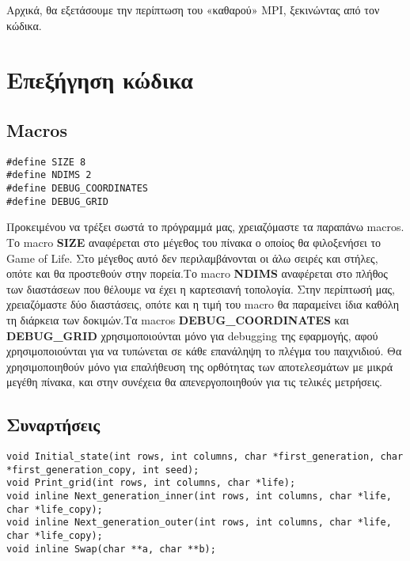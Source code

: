 Αρχικά, θα εξετάσουμε την περίπτωση του «καθαρού» MPI, ξεκινώντας από τον κώδικα.
\section{Επεξήγηση κώδικα}

\subsection{Macros} \label{sec:macros}

\begin{tcolorbox}
\begin{verbatim}
#define SIZE 8
#define NDIMS 2
#define DEBUG_COORDINATES
#define DEBUG_GRID
\end{verbatim}
\end{tcolorbox}

\begin{multicols}{2}
Προκειμένου να τρέξει σωστά το πρόγραμμά μας, χρειαζόμαστε τα παραπάνω macros. 
Το macro \textbf{SIZE} αναφέρεται στο μέγεθος του πίνακα ο οποίος θα φιλοξενήσει το Game of Life. Στο μέγεθος αυτό δεν περιλαμβάνονται οι άλω σειρές και στήλες, οπότε και θα προστεθούν στην πορεία.Το macro \textbf{NDIMS} αναφέρεται στο πλήθος των διαστάσεων που θέλουμε να έχει η καρτεσιανή τοπολογία. Στην περίπτωσή μας, χρειαζόμαστε δύο διαστάσεις, οπότε και η τιμή του macro θα παραμείνει ίδια καθόλη τη διάρκεια των δοκιμών.Τα macros \textbf{DEBUG\_COORDINATES} και \textbf{DEBUG\_GRID} χρησιμοποιούνται μόνο για debugging της εφαρμογής, αφού χρησιμοποιούνται για να τυπώνεται σε κάθε επανάληψη το πλέγμα του παιχνιδιού. Θα χρησιμοποιηθούν μόνο για επαλήθευση της ορθότητας των αποτελεσμάτων με μικρά μεγέθη πίνακα, και στην συνέχεια θα απενεργοποιηθούν για τις τελικές μετρήσεις.
\end{multicols}

\subsection{Συναρτήσεις}

\begin{tcolorbox}
\begin{verbatim}
void Initial_state(int rows, int columns, char *first_generation, char *first_generation_copy, int seed);
void Print_grid(int rows, int columns, char *life);
void inline Next_generation_inner(int rows, int columns, char *life, char *life_copy);
void inline Next_generation_outer(int rows, int columns, char *life, char *life_copy);
void inline Swap(char **a, char **b);
\end{verbatim}
\end{tcolorbox}

